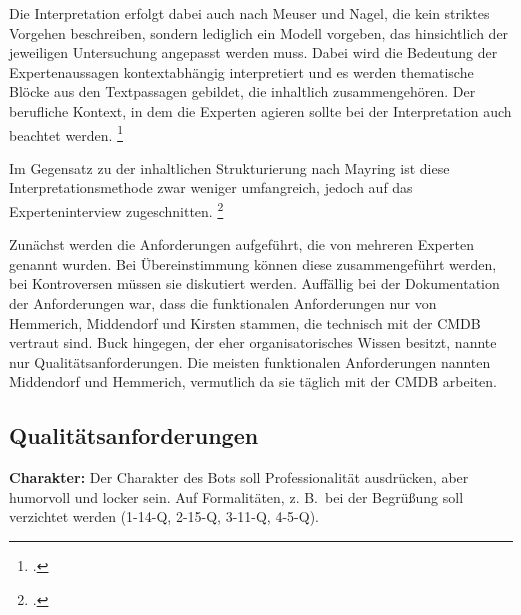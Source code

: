Die Interpretation erfolgt dabei auch nach Meuser und Nagel, die kein striktes Vorgehen beschreiben, sondern lediglich ein Modell vorgeben, das hinsichtlich der jeweiligen Untersuchung angepasst werden muss.
Dabei wird die Bedeutung der Expertenaussagen kontextabhängig interpretiert und es werden thematische Blöcke aus den Textpassagen gebildet, die inhaltlich zusammengehören.
Der berufliche Kontext, in dem die Experten agieren sollte bei der Interpretation auch beachtet werden.
\footcite[Vgl.][452\psq]{Meuser_1991_Interview}

Im Gegensatz zu der inhaltlichen Strukturierung nach Mayring ist diese Interpretationsmethode zwar weniger umfangreich, jedoch auf das Experteninterview zugeschnitten.
\footcite[Vgl.][103\psq]{Mayring_2015_qualitative_Inhaltsanalyse}

Zunächst werden die Anforderungen aufgeführt, die von mehreren Experten genannt wurden. Bei Übereinstimmung können diese zusammengeführt werden, bei Kontroversen müssen sie diskutiert werden. Auffällig bei der Dokumentation der Anforderungen war, dass die funktionalen Anforderungen nur von Hemmerich, Middendorf und Kirsten stammen, die technisch mit der \acs{CMDB} vertraut sind. Buck hingegen, der eher organisatorisches Wissen besitzt, nannte nur Qualitätsanforderungen. Die meisten funktionalen Anforderungen nannten Middendorf und Hemmerich, vermutlich da sie täglich mit der \acs{CMDB} arbeiten.


\newpage
\subsection{Qualitätsanforderungen}

\textbf{Charakter:} Der Charakter des Bots soll Professionalität ausdrücken, aber humorvoll und locker sein. Auf Formalitäten, z. B.~bei der Begrüßung soll verzichtet werden (1-14-Q, 2-15-Q, 3-11-Q, 4-5-Q).

